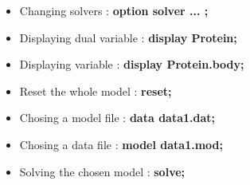 \documentclass[a4paper,11pt]{article}
\begin{document}
\begin{itemize}
  \item Changing solvers : \textbf{option solver ... ;}
  \item Displaying dual variable : \textbf{display Protein;}
  \item Displaying variable : \textbf{display Protein.body;}
  \item Reset the whole model : \textbf{reset;}
  \item Chosing a model file : \textbf{data data1.dat;}
  \item Chosing a data file : \textbf{model data1.mod;}
  \item Solving the chosen model : \textbf{solve;}
\end{itemize} 
\end{document}
